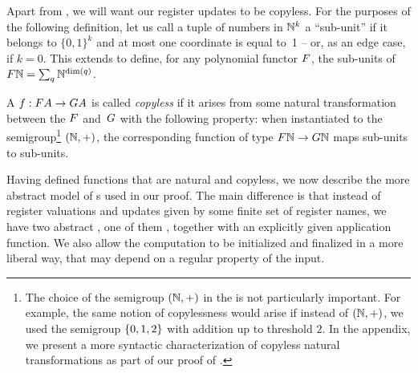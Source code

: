 Apart from , we will want our register updates to be copyless.
For the purposes of the following definition, let us call a tuple of numbers in
${\mathbb N}^k$ a \enquote{sub-unit} if it belongs to $\{0,1\}^k$ and at most one
coordinate is equal to~1 -- or, as an edge case, if $k=0$. This extends to
define, for any polynomial functor $\functor$, the sub-units of $\functor\Nat =
\sum_q \Nat^{\dim(q)}$.

\begin{definition} \label{def:copyless} A
   $f : \functor A \to \functorg A$ is called \emph{copyless}
  if it arises from some natural transformation between the  $\functor$ and~$\functorg$ with the following property:
  when instantiated to the semigroup\footnote{The choice of the semigroup
    $({\mathbb N},+)$ in the  is not particularly important. For
    example, the same notion of copylessness would arise if instead of
    $({\mathbb N},+)$, we used the semigroup $\{0,1,2\}$ with addition up to
    threshold $2$. In the appendix, we present a more syntactic characterization of
    copyless natural transformations as part of our proof of
    .} $({\mathbb N},+)$, the corresponding function of type $\functor \Nat \to \functorg \Nat$ 
    maps sub-units to sub-units.
\end{definition}

Having defined functions that are natural and copyless, we now describe the more
abstract model of \sst{}s used in our proof. The main difference is that instead
of register valuations and updates given by some finite set of register names,
we have two abstract , one of them ,
together with an explicitly given application function. We also allow the
computation to be initialized and finalized in a more liberal way, that may depend on a
regular property of the input.

